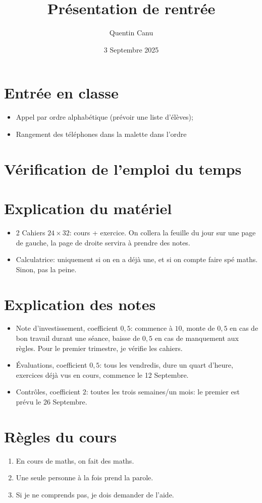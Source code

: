 \documentclass{article}
\title{Présentation de rentrée}
\date{3 Septembre 2025}
\author{Quentin Canu}
\begin{document}
\maketitle
\section{Entrée en classe}
\begin{itemize}
\item Appel par ordre alphabétique (prévoir une liste d'élèves);
\item Rangement des téléphones dans la malette dans l'ordre
\end{itemize}
\section{Vérification de l'emploi du temps}
\section{Explication du matériel}
\begin{itemize}
\item 2 Cahiers $24 \times 32$: cours + exercice. On collera la feuille du jour sur une page de gauche, la page de droite servira à prendre des notes.
\item Calculatrice: uniquement si on en a déjà une, et si on compte faire spé maths. Sinon, pas la peine.
\end{itemize}
\section{Explication des notes}
\begin{itemize}
\item Note d'investissement, coefficient $0,5$: commence à $10$, monte de $0,5$ en cas de bon travail durant une séance, baisse de $0,5$ en cas de manquement aux règles. Pour le premier trimestre, je vérifie les cahiers.
\item Évaluations, coefficient $0,5$: tous les vendredis, dure un quart d'heure, exercices déjà vus en cours, commence le 12 Septembre.
\item Contrôles, coefficient $2$: toutes les trois semaines/un mois: le premier est prévu le 26 Septembre.
\end{itemize}
\section{Règles du cours}
\begin{enumerate}
\item En cours de maths, on fait des maths.
\item Une seule personne à la fois prend la parole.
\item Si je ne comprends pas, je dois demander de l'aide.
\end{enumerate}
\end{document}
